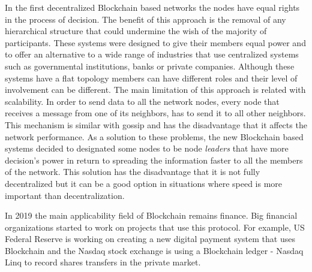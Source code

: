 In the first decentralized Blockchain based networks the nodes have equal rights in the process of decision. The benefit of this approach is the removal of any hierarchical structure that could undermine the wish of the majority of participants. These systems were designed to give their members equal power and to offer an alternative to a wide range of industries that use centralized systems such as governmental institutions, banks or private companies. Although these systems have a flat topology members can have different roles and their level of involvement can be different. The main limitation of this approach is related with scalability. In order to send data to all the network nodes, every node that receives a message from one of its neighbors, has to send it to all other neighbors. This mechanism is similar with gossip and has the disadvantage that it affects the network performance. As a solution to these problems, the new Blockchain based systems decided to designated some nodes to be node \emph{leaders} that have more decision's power in return to spreading the information faster to all the members of the network. This solution has the disadvantage that it is not fully decentralized but it can be a good option in situations where speed is more important than decentralization.

In 2019 the main applicability field of Blockchain remains finance. Big financial organizations started to work on projects that use this protocol. For example, US Federal Reserve is working on creating a new digital payment system that uses Blockchain and the Nasdaq stock exchange is using a Blockchain ledger - Nasdaq Linq to record shares transfers in the private market.

